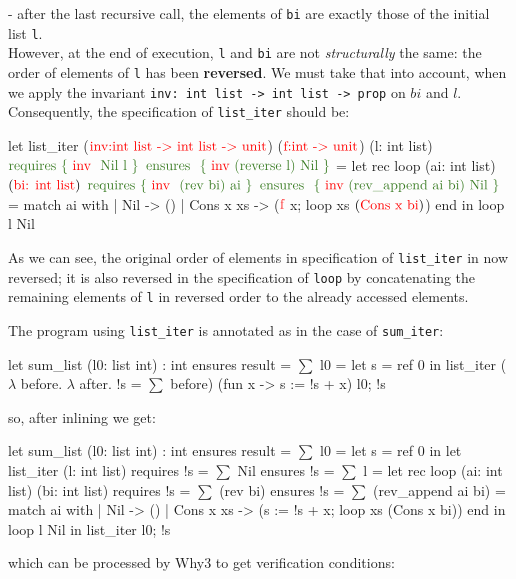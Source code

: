 \documentclass[a4paper,11pt,oneside]{article}
\theoremstyle{plain}
\begin{document}
	- after the last recursive call, the elements of \texttt{bi} are  exactly those of the initial list \texttt{l}. \\

However, at the end of execution, \texttt{l} and \texttt{bi} are not \textit{structurally} the same: the order of elements of \texttt{l} has been \textbf{reversed}. We must take that into account, when we apply the invariant \texttt{inv: int list -> int list -> prop} on $bi$ and $l$. Consequently, the specification of \texttt{list\_iter} should be: 
\hypertarget{list-iter}{}

\begin{small}
	\begin{minipage}[t]{0.4\linewidth}	
	\begin{whycode}  
let list_iter ($\textcolor{red}{\text{inv:int list -> int list -> unit}}$) ($\textcolor{red}{\text{f:int -> unit}}$) (l: int list)
     $\textcolor{OliveGreen}{\text{requires \{ \textcolor{red}{\text{inv }} Nil~l \}}}$
     $\textcolor{OliveGreen}{\text{ensures~~}\{ \text{ \textcolor{red}{inv} (reverse l)~Nil
     	 }\}}$    
 = let rec loop (ai: int list) $(\textcolor{red}{\text{bi: int list}})$
     $\textcolor{OliveGreen}{\text{requires \{
         \textcolor{red}{\text{inv }} (rev bi)~ai \}}}$
     $\textcolor{OliveGreen}{\text{ensures~~}\{ \text{ \textcolor{red}{inv} (rev\_append ai bi)~Nil
     	 }\}}$  
    = match ai with 
       | Nil       -> ()
       | Cons x xs -> ($\textcolor{red}{\text{f}}$ x; loop xs $(\textcolor{red}{\text{Cons x bi}})$) end
   in loop l Nil
 	\end{whycode}
 	\end{minipage}
 \end{small}	 

As we can see, the original order of elements in specification of \texttt{list\_iter} in now reversed; it is also reversed in the specification of \texttt{loop} by concatenating the remaining elements of \texttt{l} in reversed order to the already accessed elements.

The program  using \texttt{list\_iter} is annotated as in the case of \texttt{sum\_iter}:
\begin{whycode}
  let sum_list (l0: list int) : int
    ensures { result = $\sum$ l0 }
  = let s = ref 0 in
    list_iter
       ($\lambda$ before. $\lambda$ after. !s = $\sum$ before)
       (fun x -> s := !s + x) l0; !s
\end{whycode}
so, after inlining we get:
\begin{whycode}
let sum_list (l0: list int) : int
  ensures { result = $\sum$ l0 }
= let s = ref 0 in
  let list_iter (l: int list)
     requires { !s = $\sum$ Nil }
     ensures  { !s = $\sum$ l }
   = let rec loop (ai: int list) (bi: int list)
       requires { !s = $\sum$ (rev bi) }
       ensures  { !s = $\sum$ (rev_append ai bi) }
     = match ai with
       | Nil       -> ()
       | Cons x xs -> (s := !s + x; loop xs (Cons x bi))  end
     in loop l Nil
  in list_iter l0; !s
\end{whycode}
which can be processed by Why3 to get verification conditions:
\end{document}
